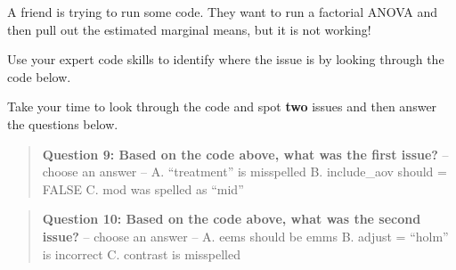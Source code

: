 \documentclass[
]{book}
\newenvironment{Shaded}{\begin{snugshade}}{\end{snugshade}}
\newcommand{\AttributeTok}[1]{\textcolor[rgb]{0.13,0.29,0.53}{#1}}
\newcommand{\ConstantTok}[1]{\textcolor[rgb]{0.56,0.35,0.01}{#1}}
\newcommand{\DecValTok}[1]{\textcolor[rgb]{0.00,0.00,0.81}{#1}}
\newcommand{\FunctionTok}[1]{\textcolor[rgb]{0.13,0.29,0.53}{\textbf{#1}}}
\newcommand{\NormalTok}[1]{#1}
\newcommand{\OtherTok}[1]{\textcolor[rgb]{0.56,0.35,0.01}{#1}}
\newcommand{\SpecialCharTok}[1]{\textcolor[rgb]{0.81,0.36,0.00}{\textbf{#1}}}
\newcommand{\StringTok}[1]{\textcolor[rgb]{0.31,0.60,0.02}{#1}}
\begin{document}
A friend is trying to run some code. They want to run a factorial ANOVA and then pull out the estimated marginal means, but it is not working!

Use your expert code skills to identify where the issue is by looking through the code below.

\begin{Shaded}
\end{Shaded}

Take your time to look through the code and spot \textbf{two} issues and then answer the questions below.

\begin{quote}
\textbf{Question 9: Based on the code above, what was the first issue?} -- choose an answer -- A. ``treatment'' is misspelled B. include\_aov should = FALSE C. mod was spelled as ``mid''
\end{quote}

\begin{quote}
\textbf{Question 10: Based on the code above, what was the second issue?} -- choose an answer -- A. eems should be emms B. adjust = ``holm'' is incorrect C. contrast is misspelled
\end{quote}
\end{document}
